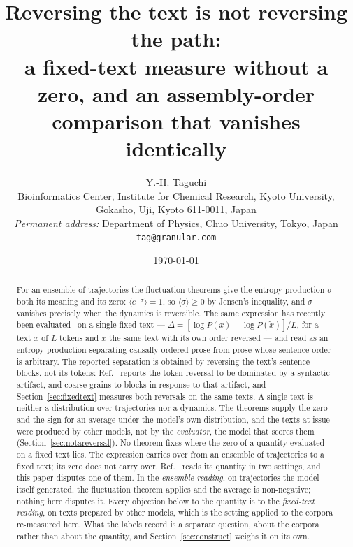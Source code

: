 \documentclass[11pt]{article}
\title{Reversing the text is not reversing the path:\\
\large a fixed-text measure without a zero, and an assembly-order
comparison that vanishes identically}
\author{Y.-H. Taguchi\\
\small Bioinformatics Center, Institute for Chemical Research, Kyoto
University, Gokasho, Uji, Kyoto 611-0011, Japan\\
\small \emph{Permanent address:} Department of Physics, Chuo University,
Tokyo, Japan\\
\small \texttt{tag@granular.com}}
\date{\today}
\begin{document}
\maketitle

\begin{abstract}
For an ensemble of trajectories the fluctuation theorems give the entropy
production $\sigma$ both its meaning and its zero: $\langle e^{-\sigma}
\rangle = 1$, so $\langle \sigma \rangle \geq 0$ by Jensen's inequality, and
$\sigma$ vanishes precisely when the dynamics is reversible.
The same expression has recently been evaluated~\cite{sagawa2026} on a single
fixed text ---
$\Delta = [\log P(x) - \log P(\tilde{x})]/L$, for a text $x$ of $L$ tokens and
$\tilde{x}$ the same text with its own order reversed --- and read as an
entropy production separating causally ordered prose from prose whose
sentence order is arbitrary.  The reported separation is obtained by
reversing the text's sentence blocks, not its tokens: Ref.~\cite{sagawa2026}
reports the token reversal to be dominated by a syntactic artifact, and
coarse-grains to blocks in response to that artifact, and
Section~\ref{sec:fixedtext} measures both reversals on the same texts.
A single
text is neither a distribution over trajectories nor a dynamics.  The
theorems supply the zero and the sign for an average under the model's own
distribution, and the texts at issue were produced by other models, not by
the \emph{evaluator}, the model that scores
them (Section~\ref{sec:notareversal}).  No theorem
fixes where the zero of a quantity evaluated on a fixed text lies.  The expression carries
over from an ensemble of trajectories to a fixed text; its zero does not
carry over.
Ref.~\cite{sagawa2026} reads its quantity in two settings, and this paper
disputes one of them.  In the \emph{ensemble reading}, on trajectories the
model itself generated, the fluctuation theorem applies and the average is
non-negative; nothing here disputes it.  Every objection below to the
quantity is to the \emph{fixed-text reading}, on texts prepared by other
models, which is the setting applied to the corpora re-measured here.  What
the labels record is a separate question, about the corpora rather than
about the quantity, and Section~\ref{sec:construct} weighs it on its own.


\end{abstract}
\end{document}

